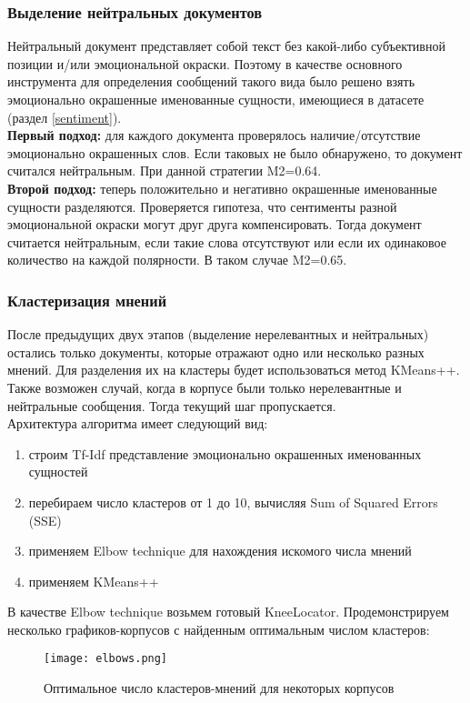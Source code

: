 \documentclass{article}
\begin{document}
\subsubsection{Выделение нейтральных документов}
Нейтральный документ представляет собой текст без какой-либо субъективной позиции и/или эмоциональной окраски. Поэтому в качестве основного инструмента для определения сообщений такого вида было решено взять эмоционально окрашенные именованные сущности, имеющиеся в датасете (раздел \textcolor{cyan}{\ref{sentiment}}).\\

\textbf{Первый подход:} для каждого документа проверялось наличие/отсутствие эмоционально окрашенных слов. Если таковых не было обнаружено, то документ считался нейтральным. При данной стратегии M2=0.64.\\

\textbf{Второй подход:} теперь положительно и негативно окрашенные именованные сущности разделяются. Проверяется гипотеза, что сентименты разной эмоциональной окраски могут друг друга компенсировать. Тогда документ считается нейтральным, если такие слова отсутствуют или если их одинаковое количество на каждой полярности. В таком случае M2=0.65.
\subsubsection{Кластеризация мнений}
После предыдущих двух этапов (выделение нерелевантных и нейтральных) остались только документы, которые отражают одно или несколько разных мнений. Для разделения их на кластеры будет использоваться метод KMeans++. Также возможен случай, когда в корпусе были только нерелевантные и нейтральные сообщения. Тогда текущий шаг пропускается.\\

Архитектура алгоритма имеет следующий вид:
\begin{enumerate}
    \item строим Tf-Idf представление эмоционально окрашенных именованных сущностей
    \item перебираем число кластеров от 1 до 10, вычисляя Sum of Squared Errors (SSE)
    \item применяем Elbow technique для нахождения искомого числа мнений
    \item применяем KMeans++
\end{enumerate}

В качестве Elbow technique возьмем готовый KneeLocator. Продемонстрируем несколько графиков-корпусов с найденным оптимальным числом кластеров:
\begin{figure}[!htb]
    \center
        \texttt{[image: elbows.png]}
        \caption{Оптимальное число кластеров-мнений для некоторых корпусов}
\end{figure}
\end{document}
